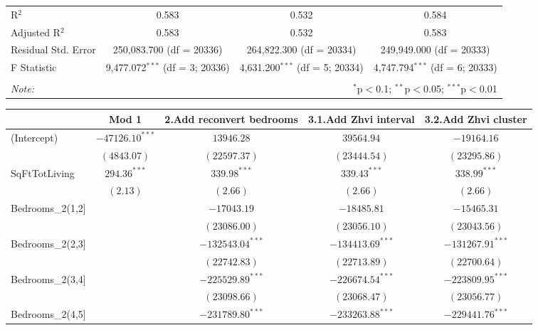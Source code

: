 \documentclass[12pt,a4paper,landscape]{article}
\begin{document}
\begin{table}[H]
\begin{tabular}{@{\extracolsep{5pt}}lccc}
		R$^{2}$ & 0.583 & 0.532 & 0.584 \\ 
		Adjusted R$^{2}$ & 0.583 & 0.532 & 0.583 \\ 
		Residual Std. Error & 250,083.700 (df = 20336) & 264,822.300 (df = 20334) & 249,949.000 (df = 20333) \\ 
		F Statistic & 9,477.072$^{***}$ (df = 3; 20336) & 4,631.200$^{***}$ (df = 5; 20334) & 4,747.794$^{***}$ (df = 6; 20333) \\ 
		\hline 
		\hline \\[-1.8ex] 
		\textit{Note:}  & \multicolumn{3}{r}{$^{*}$p$<$0.1; $^{**}$p$<$0.05; $^{***}$p$<$0.01} \\ 
	\end{tabular} 
\end{table} 

\begin{table}[H]
	\begin{center}
		\begin{tabular}{l c c c c}
			\hline
			& Mod 1 & 2.Add reconvert bedrooms & 3.1.Add Zhvi interval & 3.2.Add Zhvi cluster \\
			\hline
			(Intercept)             & $-47126.10^{***}$ & $13946.28$         & $39564.94$         & $-19164.16$        \\
			& $(4843.07)$       & $(22597.37)$       & $(23444.54)$       & $(23295.86)$       \\
			SqFtTotLiving           & $294.36^{***}$    & $339.98^{***}$     & $339.43^{***}$     & $338.99^{***}$     \\
			& $(2.13)$          & $(2.66)$           & $(2.66)$           & $(2.66)$           \\
			Bedrooms\_2(1,2]        &                   & $-17043.19$        & $-18485.81$        & $-15465.31$        \\
			&                   & $(23086.00)$       & $(23056.10)$       & $(23043.56)$       \\
			Bedrooms\_2(2,3]        &                   & $-132543.04^{***}$ & $-134413.69^{***}$ & $-131267.91^{***}$ \\
			&                   & $(22742.83)$       & $(22713.89)$       & $(22700.64)$       \\
			Bedrooms\_2(3,4]        &                   & $-225529.89^{***}$ & $-226674.54^{***}$ & $-223809.95^{***}$ \\
			&                   & $(23098.66)$       & $(23068.47)$       & $(23056.77)$       \\
			Bedrooms\_2(4,5]        &                   & $-231789.80^{***}$ & $-233263.88^{***}$ & $-229441.76^{***}$ \\

\end{tabular}
\end{center}
\end{table}
\end{document}
